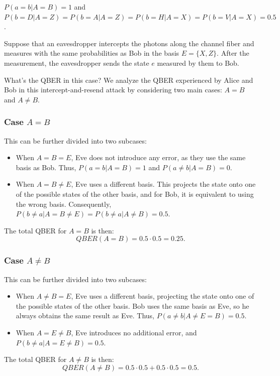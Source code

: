 \documentclass[prl,twocolumn]{revtex4-1}
\begin{document}
$P(a = b|A = B) = 1$ and $P(b = D|A = Z) = P(b = A|A = Z) = P(b = H|A = X) = P(b = V|A = X) = 0.5$.

Suppose that an eavesdropper intercepts the photons along the channel fiber and measures with the same probabilities as Bob in the basis $E = \{X, Z\}$. After the measurement, the eavesdropper sends the state $e$ measured by them to Bob. 

What's the QBER in this case? We analyze the QBER experienced by Alice and Bob in this intercept-and-resend attack by considering two main cases: $A = B$ and $A \neq B$.

\subsubsection{Case $A = B$}

This can be further divided into two subcases:
\begin{itemize}
    \item When $A = B = E$, Eve does not introduce any error, as they use the same basis as Bob. Thus, $P(a = b|A = B) = 1$ and $P(a \neq b|A = B) = 0$.
    \item When $A = B \neq E$, Eve uses a different basis. This projects the state onto one of the possible states of the other basis, and for Bob, it is equivalent to using the wrong basis. Consequently, $P(b \neq a|A = B \neq E) = P(b \neq a|A \neq B) = 0.5$.
\end{itemize}

The total QBER for $A = B$ is then:
$$
QBER(A = B) = 0.5 \cdot 0.5 = 0.25.
$$

\subsubsection{Case $A \neq B$}
This can be further divided into two subcases:
\begin{itemize}
    \item When $A \neq B = E$, Eve uses a different basis, projecting the state onto one of the possible states of the other basis. Bob uses the same basis as Eve, so he always obtains the same result as Eve. Thus, $P(a \neq b|A \neq E = B) = 0.5$.
    \item When $A = E \neq B$, Eve introduces no additional error, and $P(b \neq a|A = E \neq B) = 0.5$.
\end{itemize}

The total QBER for $A \neq B$ is then:
$$
QBER(A \neq B) = 0.5 \cdot 0.5 + 0.5 \cdot 0.5 = 0.5.
$$
\end{document}
